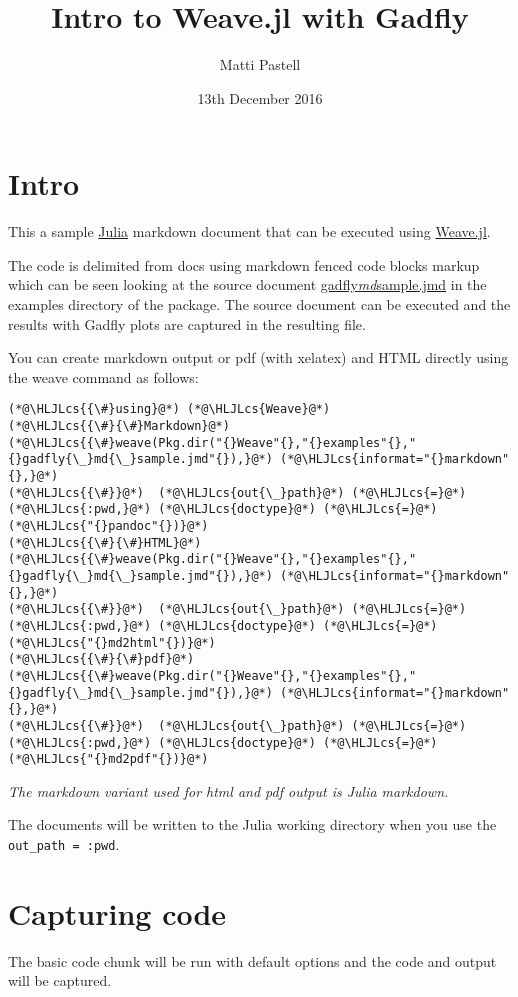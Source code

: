 \documentclass[12pt,a4paper]{article}
\title{ Intro to Weave.jl with Gadfly }
\author{ Matti Pastell }
\date{ 13th December 2016 }
\newcommand{\HLJLcs}[1]{\textcolor[RGB]{153,153,119}{\textit{#1}}}
\begin{document}
\maketitle

\section{Intro}
This a sample \href{http://julialang.org/}{Julia} markdown document that can be executed using \href{https://github.com/JunoLab/Weave.jl}{Weave.jl}.

The code is delimited from docs using markdown fenced code blocks markup which can be seen looking at the source document \href{gadfly_md_sample.jmd}{gadfly\emph{md}sample.jmd} in the examples directory of the package. The source document can be executed and the results with Gadfly plots are captured in the resulting file.

You can create markdown output or pdf (with xelatex) and HTML directly using the weave command as follows:


\begin{lstlisting}
(*@\HLJLcs{{\#}using}@*) (*@\HLJLcs{Weave}@*)
(*@\HLJLcs{{\#}{\#}Markdown}@*)
(*@\HLJLcs{{\#}weave(Pkg.dir("{}Weave"{},"{}examples"{},"{}gadfly{\_}md{\_}sample.jmd"{}),}@*) (*@\HLJLcs{informat="{}markdown"{},}@*)
(*@\HLJLcs{{\#}}@*)  (*@\HLJLcs{out{\_}path}@*) (*@\HLJLcs{=}@*) (*@\HLJLcs{:pwd,}@*) (*@\HLJLcs{doctype}@*) (*@\HLJLcs{=}@*) (*@\HLJLcs{"{}pandoc"{})}@*)
(*@\HLJLcs{{\#}{\#}HTML}@*)
(*@\HLJLcs{{\#}weave(Pkg.dir("{}Weave"{},"{}examples"{},"{}gadfly{\_}md{\_}sample.jmd"{}),}@*) (*@\HLJLcs{informat="{}markdown"{},}@*)
(*@\HLJLcs{{\#}}@*)  (*@\HLJLcs{out{\_}path}@*) (*@\HLJLcs{=}@*) (*@\HLJLcs{:pwd,}@*) (*@\HLJLcs{doctype}@*) (*@\HLJLcs{=}@*) (*@\HLJLcs{"{}md2html"{})}@*)
(*@\HLJLcs{{\#}{\#}pdf}@*)
(*@\HLJLcs{{\#}weave(Pkg.dir("{}Weave"{},"{}examples"{},"{}gadfly{\_}md{\_}sample.jmd"{}),}@*) (*@\HLJLcs{informat="{}markdown"{},}@*)
(*@\HLJLcs{{\#}}@*)  (*@\HLJLcs{out{\_}path}@*) (*@\HLJLcs{=}@*) (*@\HLJLcs{:pwd,}@*) (*@\HLJLcs{doctype}@*) (*@\HLJLcs{=}@*) (*@\HLJLcs{"{}md2pdf"{})}@*)
\end{lstlisting}

\emph{The markdown variant used for html and pdf output is Julia markdown.}

The documents will be written to the Julia working directory when you use the \texttt{out\_path = :pwd}.

\section{Capturing code}
The basic code chunk will be run with default options and the code and output will be captured.
\end{document}
